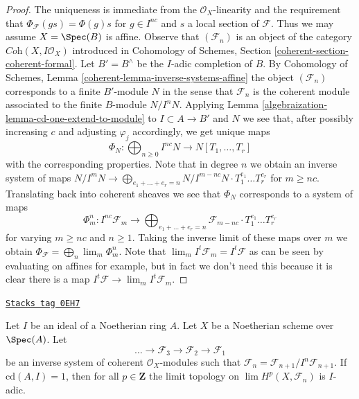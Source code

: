 \begin{proof}

The uniqueness is immediate from the $\mathcal{O}_X$-linearity
and the requirement that $\Phi_\mathcal{F}(g s) = \Phi(g) s$ for
$g \in I^{nc}$ and $s$ a local section of $\mathcal{F}$.
Thus we may assume $X = \Spec(B)$ is affine.
Observe that $(\mathcal{F}_n)$ is an object of the category
$\textit{Coh}(X, I\mathcal{O}_X)$ introduced
in Cohomology of Schemes, Section \ref{coherent-section-coherent-formal}.
Let $B' = B^\wedge$ be the $I$-adic completion of $B$.
By Cohomology of Schemes, Lemma \ref{coherent-lemma-inverse-systems-affine}
the object $(\mathcal{F}_n)$ corresponds to a finite $B'$-module $N$
in the sense that $\mathcal{F}_n$ is the coherent
module associated to the finite $B$-module $N/I^n N$.
Applying Lemma \ref{algebraization-lemma-cd-one-extend-to-module}
to $I \subset A \to B'$ and $N$
we see that, after possibly increasing $c$ and adjusting
$\varphi_j$ accordingly, we get unique maps
$$
\Phi_N : \bigoplus\nolimits_{n \geq 0} I^{nc}N \to N[T_1, \ldots, T_r]
$$
with the corresponding properties. Note that in degree $n$ we obtain
an inverse system of maps $N/I^mN \to \bigoplus_{e_1 + \ldots + e_r = n}
N/I^{m - nc}N \cdot T_1^{e_1} \ldots T_r^{e_r}$ for $m \geq nc$.
Translating back into coherent
sheaves we see that $\Phi_N$ corresponds to a system of maps
$$
\Phi^n_m :
I^{nc}\mathcal{F}_m
\longrightarrow
\bigoplus\nolimits_{e_1 + \ldots + e_r = n}
\mathcal{F}_{m - nc} \cdot T_1^{e_1} \ldots T_r^{e_r}
$$
for varying $m \geq nc$ and $n \geq 1$. Taking the inverse limit of
these maps over $m$ we obtain $\Phi_\mathcal{F} = \bigoplus_n \lim_m \Phi^n_m$.
Note that $\lim_m I^t\mathcal{F}_m = I^t \mathcal{F}$ as can be seen by
evaluating on affines for example, but in fact we don't need this because
it is clear there is a map $I^t\mathcal{F} \to \lim_m I^t\mathcal{F}_m$.
\end{proof}

\begin{lemma}
\label{algebraization-lemma-topology-I-adic}
\href{https://stacks.math.columbia.edu/tag/0EH7}{\texttt{Stacks tag 0EH7}}

Let $I$ be an ideal of a Noetherian ring $A$. Let $X$ be a Noetherian scheme
over $\Spec(A)$. Let
$$
\ldots \to \mathcal{F}_3 \to \mathcal{F}_2 \to \mathcal{F}_1
$$
be an inverse system of coherent $\mathcal{O}_X$-modules
such that $\mathcal{F}_n = \mathcal{F}_{n + 1}/I^n\mathcal{F}_{n + 1}$.
If $\text{cd}(A, I) = 1$, then for all $p \in \mathbf{Z}$ the limit topology on
$\lim H^p(X, \mathcal{F}_n)$ is $I$-adic.
\end{lemma}

